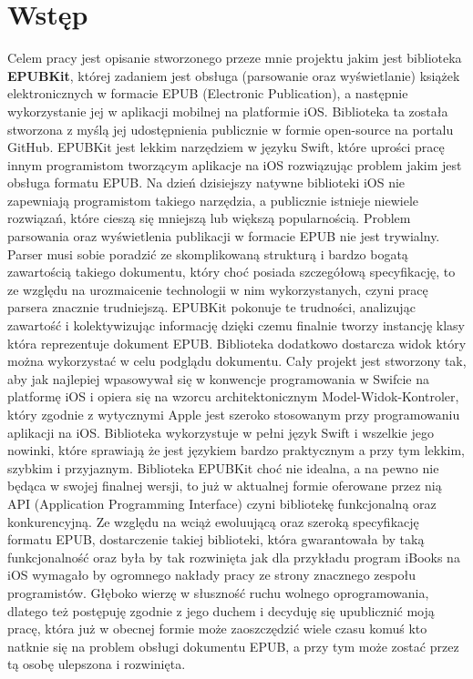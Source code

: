 \chapter{Wstęp}

Celem pracy jest opisanie stworzonego przeze mnie projektu jakim jest biblioteka \textbf{EPUBKit}, której zadaniem jest obsługa (parsowanie oraz wyświetlanie) książek elektronicznych w formacie EPUB (Electronic Publication), a następnie wykorzystanie jej w aplikacji mobilnej na platformie iOS. Biblioteka ta została stworzona z myślą jej udostępnienia publicznie w formie open-source na portalu GitHub. EPUBKit jest lekkim narzędziem w języku Swift, które uprości pracę innym programistom tworzącym aplikacje na iOS rozwiązując problem jakim jest obsługa formatu EPUB. Na dzień dzisiejszy natywne biblioteki iOS nie zapewniają programistom takiego narzędzia, a publicznie istnieje niewiele rozwiązań, które cieszą się mniejszą lub większą popularnością. Problem parsowania oraz wyświetlenia publikacji w formacie EPUB nie jest trywialny. Parser musi sobie poradzić ze skomplikowaną strukturą i bardzo bogatą zawartością takiego dokumentu, który choć posiada szczegółową specyfikację, to ze względu na urozmaicenie technologii w nim wykorzystanych, czyni pracę parsera znacznie trudniejszą. EPUBKit pokonuje te trudności, analizując zawartość i kolektywizując informację dzięki czemu finalnie tworzy instancję klasy która reprezentuje dokument EPUB. Biblioteka dodatkowo dostarcza widok który można wykorzystać w celu podglądu dokumentu. Cały projekt jest stworzony tak, aby jak najlepiej wpasowywał się w konwencje programowania w Swifcie na platformę iOS i opiera się na wzorcu architektonicznym Model-Widok-Kontroler, który zgodnie z wytycznymi Apple jest szeroko stosowanym przy programowaniu aplikacji na iOS. Biblioteka wykorzystuje w pełni język Swift i wszelkie jego nowinki, które sprawiają że jest językiem bardzo praktycznym a przy tym lekkim, szybkim i przyjaznym. Biblioteka EPUBKit choć nie idealna, a na pewno nie będąca w swojej finalnej wersji, to już w aktualnej formie oferowane przez nią API (Application Programming Interface) czyni bibliotekę funkcjonalną oraz konkurencyjną. Ze względu na wciąż ewoluującą oraz szeroką specyfikację formatu EPUB, dostarczenie takiej biblioteki, która gwarantowała by taką funkcjonalność oraz była by tak rozwinięta jak dla przykładu program iBooks na iOS wymagało by ogromnego nakłady pracy ze strony znacznego zespołu programistów. Głęboko wierzę w słuszność ruchu wolnego oprogramowania, dlatego też postępuję zgodnie z jego duchem i decyduję się upublicznić moją pracę, która już w obecnej formie może zaoszczędzić wiele czasu komuś kto natknie się na problem obsługi dokumentu EPUB, a przy tym może zostać przez tą osobę ulepszona i rozwinięta.

